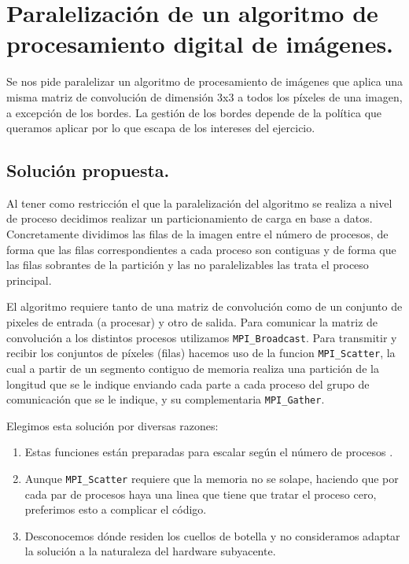\section{Paralelización de un algoritmo de procesamiento digital de imágenes.}

Se nos pide paralelizar un algoritmo de procesamiento de imágenes que aplica una misma
matriz de convolución de dimensión 3x3 a todos los píxeles de una imagen, a excepción de los bordes. La
gestión de los bordes depende de la política que queramos aplicar por lo que escapa de
los intereses del ejercicio.
\subsection{Solución propuesta.}

Al tener como restricción el que la paralelización del algoritmo
se realiza a nivel de proceso decidimos realizar un particionamiento de carga en base
a datos. Concretamente dividimos las filas de la imagen entre el número de procesos, de forma
que las filas correspondientes a cada proceso son contiguas y de forma que las filas
sobrantes de la partición y las no paralelizables las trata el proceso principal.

El algoritmo requiere tanto de una matriz de convolución como de un conjunto de pixeles de entrada
(a procesar) y otro de salida. Para comunicar la matriz de convolución a los distintos procesos
utilizamos \texttt{MPI\_Broadcast}.
Para transmitir y recibir los conjuntos de píxeles (filas) hacemos uso de la funcion \texttt{MPI\_Scatter}, la cual a partir
de un segmento contiguo de memoria realiza una partición de la longitud que se le indique enviando cada
parte a cada proceso del grupo de comunicación que se le indique, y su complementaria \texttt{MPI\_Gather}.

Elegimos esta solución por diversas razones:

\begin{enumerate}
    \item Estas funciones están preparadas para escalar según el número de procesos \cite{MPIBroadcast}.
    \item Aunque \texttt{MPI\_Scatter} requiere que la memoria no se solape, haciendo que por cada par de
    procesos haya una linea que tiene que tratar el proceso cero, preferimos esto a complicar el código.
    \item Desconocemos dónde residen los cuellos de botella y no consideramos adaptar la solución
    a la naturaleza del hardware subyacente.
\end{enumerate}

